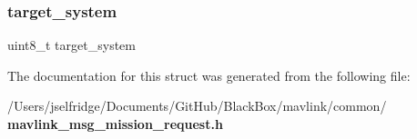 \mbox{\label{struct____mavlink__mission__request__t_ac9afff43526a157e4c4e45607c1418b8}} 
\subsubsection{target\+\_\+system}
{\footnotesize\ttfamily uint8\+\_\+t target\+\_\+system}



The documentation for this struct was generated from the following file\+:\begin{DoxyCompactItemize}
\item 
/\+Users/jselfridge/\+Documents/\+Git\+Hub/\+Black\+Box/mavlink/common/\textbf{ mavlink\+\_\+msg\+\_\+mission\+\_\+request.\+h}\end{DoxyCompactItemize}
